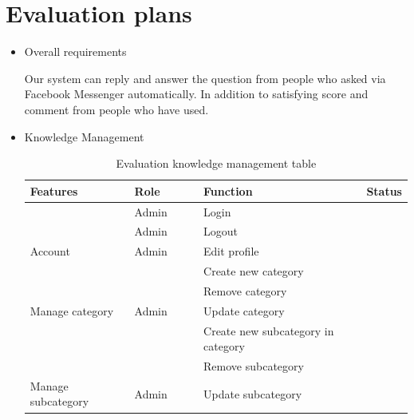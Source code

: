 \documentclass[12pt,oneside,openright,a4paper]{cpe-english-project}
\begin{document}
\section{Evaluation plans}
\begin{itemize}
  \item Overall requirements
\begin{flushleft}
Our system can reply and answer the question from people who asked via Facebook Messenger automatically. In addition to satisfying score and comment from people who have used.
\end{flushleft}

  \item Knowledge Management
\begin{table}[h]
	\caption{Evaluation knowledge management table}
	\label{tab:Evaluation knowledge management table}
\begin{adjustbox}{width=\textwidth}
\begin{tabular}{|p{0.3\linewidth}|p{0.2\linewidth}|p{0.5\linewidth}|p{0.1\linewidth}|}
\hline
\rowcolor[HTML]{C9DAF8} 
Features                             & Role                    & Function                           & Status \\ \hline
                                     & Admin                   & Login                              &        \\ \cline{2-4} 
                                     & Admin                   & Logout                             &        \\ \cline{2-4} 
\multirow{-3}{*}{Account}            & Admin                   & Edit profile                       &        \\ \hline
                                     &                         & Create new category                &        \\ \cline{3-4} 
                                     &                         & Remove category                    &        \\ \cline{3-4} 
\multirow{-3}{*}{Manage category}    & \multirow{-3}{*}{Admin} & Update category                    &        \\ \hline
                                     &                         & Create new subcategory in category &        \\ \cline{3-4} 
                                     &                         & Remove subcategory                 &        \\ \cline{3-4} 
\multirow{-3}{*}{Manage subcategory} & \multirow{-3}{*}{Admin} & Update subcategory                 &        \\ \hline

\end{tabular}
\end{adjustbox}
\end{table}
\end{itemize}
\end{document}
